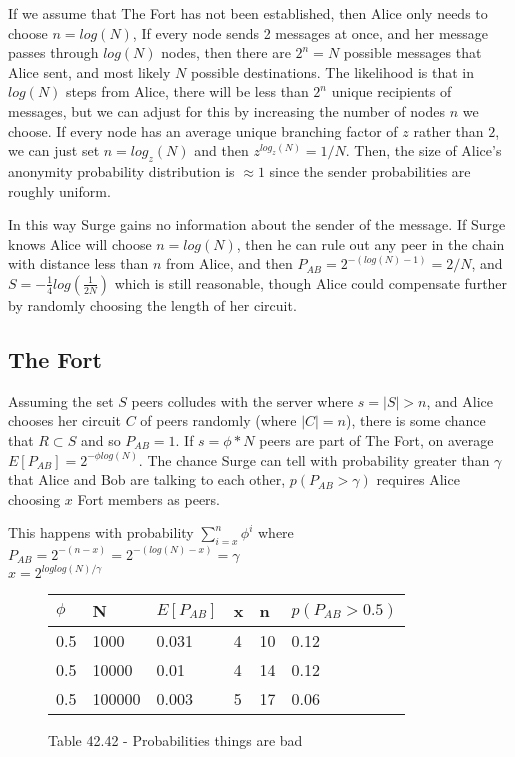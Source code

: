 \documentclass[twocolumn,11pt,english]{paper}
\begin{document}
If we assume that The Fort has not been established, then Alice only needs to choose $n = log(N)$, If every node sends 2 messages at once, and her message passes through $log(N)$ nodes, then there are $2^n = N$ possible messages that Alice sent, and most likely $N$ possible destinations. The likelihood is that in $log(N)$ steps from Alice, there will be less than $2^n$ unique recipients of messages, but we can adjust for this by increasing the number of nodes $n$ we choose. If every node has an average unique branching factor of $z$ rather than $2$, we can just set $n = log_z(N)$ and then $z^{log_z(N)} = 1/N$. Then, the size of Alice's anonymity probability distribution is $\approx 1$ since the sender probabilities are roughly uniform.

In this way Surge gains no information about the sender of the message. If Surge knows Alice will choose $n = log(N)$, then he can rule out any peer in the chain with distance less than $n$ from Alice, and then $P_{AB} = 2^{-(log(N)-1)} = 2/N$, and $S = - \frac{1}{4} log(\frac{1}{2N})$ which is still reasonable, though Alice could compensate further by randomly choosing the length of her circuit. 

\subsection{The Fort} Assuming the set $S$ peers colludes with the server where $s = |S| > n$, and Alice chooses her circuit $C$ of peers randomly (where $|C| = n$), there is some chance that $R \subset S$ and so $P_{AB} = 1$. If $s = \phi*N$ peers are part of The Fort, on average $E[P_{AB}] = 2^{-\phi log(N)}$. The chance Surge can tell with probability greater than $\gamma$ that Alice and Bob are talking to each other, $p(P_{AB} > \gamma)$ requires Alice choosing $x$ Fort members as peers. 

This happens with probability $\sum\limits_{i=x}^n\phi^i$ where 
\\ $P_{AB} = 2^{-(n - x)} = 2^{-(log(N) - x)} = \gamma$
\\ $x = 2^{loglog(N)/\gamma}$

\begin{figure}[ht]
  \begin{tabular}{| l | l | l | l | l | l |}
    \hline
    $\phi$ & N & $E[P_{AB}]$ & x & n & $p(P_{AB} > 0.5)$ \\\hline
    0.5 & 1000 & 0.031 & 4 & 10 & 0.12\\
    0.5 & 10000 & 0.01 & 4 & 14 & 0.12\\
    0.5 & 100000 & 0.003 & 5 & 17 & 0.06\\
    \hline
  \end{tabular}
  \caption{Table 42.42 - Probabilities things are bad}
\end{figure}
\end{document}

